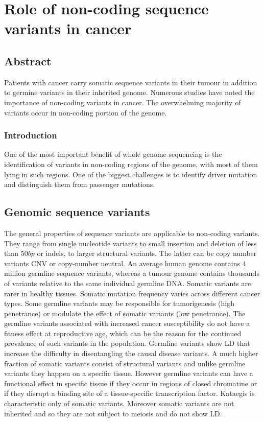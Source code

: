 \chapter{Role of non-coding sequence variants in cancer}

\section{Abstract}
Patients with cancer carry somatic sequence variants in their tumour in addition to germine variants in their inherited genome.
Numerous studies have noted the importance of non-coding variants in cancer.
The overwhelming majority of variants occur in non-coding portion of the genome.

	\subsection{Introduction}
	One of the most important benefit of whole genome sequencing is the identification of variants in non-coding regions of the genome, with most of them lying in such regions.
	One of the biggest challenges is to identify driver mutation and distinguish them from passenger mutations.

\section{Genomic sequence variants}
The general properties of sequence variants are applicable to non-coding variants.
They range from single nucleotide variants to small insertion and deletion of less than $50bp$ or indels, to larger structural variants.
The latter can be copy number variants CNV or copy-number neutral.
An average human genome contains $4$ million germline sequence variants, whereas a tumour genome contains thousands of variants relative to the same individual germline DNA.
Somatic variants are rarer in healthy tissues.
Somatic mutation frequency varies across different cancer types.
Some germline variants may be responsible for tumorigenesis (high penetrance) or modulate the effect of somatic variants (low penetrance).
The germline variants associated with increased cancer susceptibility do not have a fitness effect at reproductive age, which can be the reason for the continued prevalence of such variants in the population.
Germline variants show LD that increase the difficulty in disentangling the causal disease variants.
A much higher fraction of somatic variants consist of structural variants and unlike germline variants they happen on a specific tissue.
However germline variants can have a functional effect in specific tissue if they occur in regions of closed chromatine or if they disrupt a binding site of a tissue-specific transcription factor.
Kataegis is characteristic only of somatic variants.
Moreover somatic variants are not inherited and so they are not subject to meiosis and do not show LD.

